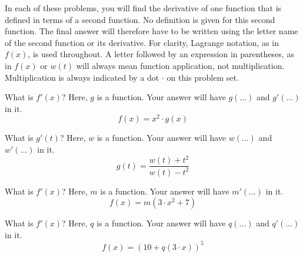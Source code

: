 
In each of these problems, you will find the derivative of one function that is defined in terms of a second function.
No definition is given for this second function.
The final answer will therefore have to be written using the letter name of the second function or its derivative.
For clarity, Lagrange notation, as in $f(x)$, is used throughout.
A letter followed by an expression in parentheses, as in $f(x)$ or $w(t)$ will always mean function application, not multiplication.
Multiplication is always indicated by a dot $\cdot$ on this problem set.

\begin{ProblemSet}[pencil space=2.5in]

 \begin{Problem}
  What is $f'(x)$?
  Here, $g$ is a function.
  Your answer will have $g(\dots)$ and $g'(\dots)$ in it.
  \begin{equation*}
   f(x) = x^2 \cdot g(x)
  \end{equation*}
 \end{Problem}

 \begin{Problem}[pencil space=3in]
  What is $g'(t)$?
  Here, $w$ is a function.
  Your answer will have $w(\dots)$ and $w'(\dots)$ in it.
  \begin{equation*}
   g(t) = \frac{w(t) + t^2}{w(t) - t^2}
  \end{equation*}
 \end{Problem}

 \begin{Problem}
  What is $f'(x)$?
  Here, $m$ is a function.
  Your answer will have $m'(\dots)$ in it.
  \begin{equation*}
   f(x) = m\!\left(3\cdot x^2 + 7\right)
  \end{equation*}
 \end{Problem}

 \begin{Problem}
  What is $f'(x)$?
  Here, $q$ is a function.
  Your answer will have $q(\dots)$ and $q'(\dots)$ in it.
  \begin{equation*}
   f(x) = (10 + q(3\cdot x))^5
  \end{equation*}
 \end{Problem}

\end{ProblemSet}

